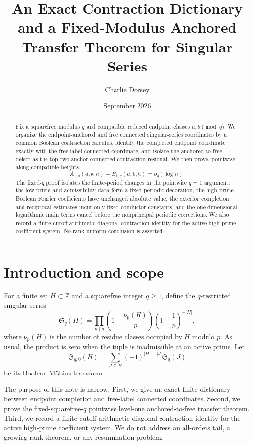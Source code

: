 \documentclass[11pt]{article}
\title{An Exact Contraction Dictionary and a Fixed-Modulus Anchored Transfer Theorem for Singular Series}
\author{Charlie Dorsey}
\date{September 2026}
\theoremstyle{definition}
\theoremstyle{remark}
\newcommand{\SSer}{\mathfrak S}
\newcommand{\1}{\mathbf 1}
\newcommand{\Zmod}{\mathbb Z}
\begin{document}
\maketitle

\begin{abstract}
Fix a squarefree modulus $q$ and compatible reduced endpoint classes $a,b\pmod q$.  We organize the endpoint-anchored and free connected singular-series coordinates by a common Boolean contraction calculus, identify the completed endpoint coordinate exactly with the free-label connected coordinate, and isolate the anchored-to-free defect as the top two-anchor connected contraction residual.  We then prove, pointwise along compatible heights,
\[
A_{1,q}(a,b;h)-B_{1,q}(a,b;h)=o_q(\log h).
\]
The fixed-$q$ proof isolates the finite-period changes in the pointwise $q=1$ argument: the low-prime and admissibility data form a fixed periodic decoration, the high-prime Boolean Fourier coefficients have unchanged absolute value, the exterior completion and reciprocal estimates incur only fixed-conductor constants, and the one-dimensional logarithmic main terms cancel before the nonprincipal periodic corrections.  We also record a finite-cutoff arithmetic diagonal-contraction identity for the active high-prime coefficient system.  No rank-uniform conclusion is asserted.
\end{abstract}

\section{Introduction and scope}\label{sec:intro}

For a finite set $H\subset\Zmod$ and a squarefree integer $q\ge1$, define the $q$-restricted singular series
\begin{equation}\label{eq:S_q}
\SSer_q(H)
=\prod_{p\nmid q}
\left(1-\frac{\nu_p(H)}p\right)
\left(1-\frac1p\right)^{-|H|},
\end{equation}
where $\nu_p(H)$ is the number of residue classes occupied by $H$ modulo $p$.  As usual, the product is zero when the tuple is inadmissible at an active prime.  Let
\begin{equation}\label{eq:S_q0}
\SSer_{q,0}(H)
=\sum_{J\subseteq H}(-1)^{|H|-|J|}\SSer_q(J)
\end{equation}
be its Boolean M\"obius transform.

The purpose of this note is narrow.  First, we give an exact finite dictionary between endpoint completion and free-label connected coordinates.  Second, we prove the fixed-squarefree-$q$ pointwise level-one anchored-to-free transfer theorem.  Third, we record a finite-cutoff arithmetic diagonal-contraction identity for the active high-prime coefficient system.  We do not address an all-orders tail, a growing-rank theorem, or any resummation problem.
\end{document}

